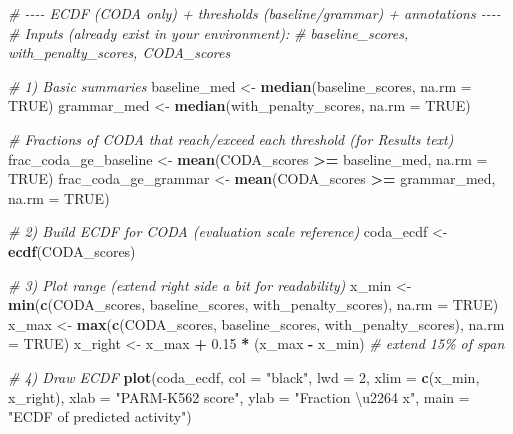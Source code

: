 \documentclass[
]{article}
\newenvironment{Shaded}{\begin{snugshade}}{\end{snugshade}}
\newcommand{\AttributeTok}[1]{\textcolor[rgb]{0.13,0.29,0.53}{#1}}
\newcommand{\CommentTok}[1]{\textcolor[rgb]{0.56,0.35,0.01}{\textit{#1}}}
\newcommand{\ConstantTok}[1]{\textcolor[rgb]{0.56,0.35,0.01}{#1}}
\newcommand{\DecValTok}[1]{\textcolor[rgb]{0.00,0.00,0.81}{#1}}
\newcommand{\FloatTok}[1]{\textcolor[rgb]{0.00,0.00,0.81}{#1}}
\newcommand{\FunctionTok}[1]{\textcolor[rgb]{0.13,0.29,0.53}{\textbf{#1}}}
\newcommand{\NormalTok}[1]{#1}
\newcommand{\OtherTok}[1]{\textcolor[rgb]{0.56,0.35,0.01}{#1}}
\newcommand{\SpecialCharTok}[1]{\textcolor[rgb]{0.81,0.36,0.00}{\textbf{#1}}}
\newcommand{\StringTok}[1]{\textcolor[rgb]{0.31,0.60,0.02}{#1}}
\begin{document}
\begin{Shaded}
\begin{Highlighting}[]
\CommentTok{\# {-}{-}{-}{-} ECDF (CODA only) + thresholds (baseline/grammar) + annotations {-}{-}{-}{-}}
\CommentTok{\# Inputs (already exist in your environment):}
\CommentTok{\#   baseline\_scores, with\_penalty\_scores, CODA\_scores}

\CommentTok{\# 1) Basic summaries}
\NormalTok{baseline\_med }\OtherTok{\textless{}{-}} \FunctionTok{median}\NormalTok{(baseline\_scores, }\AttributeTok{na.rm =} \ConstantTok{TRUE}\NormalTok{)}
\NormalTok{grammar\_med  }\OtherTok{\textless{}{-}} \FunctionTok{median}\NormalTok{(with\_penalty\_scores, }\AttributeTok{na.rm =} \ConstantTok{TRUE}\NormalTok{)}

\CommentTok{\# Fractions of CODA that reach/exceed each threshold (for Results text)}
\NormalTok{frac\_coda\_ge\_baseline }\OtherTok{\textless{}{-}} \FunctionTok{mean}\NormalTok{(CODA\_scores }\SpecialCharTok{\textgreater{}=}\NormalTok{ baseline\_med, }\AttributeTok{na.rm =} \ConstantTok{TRUE}\NormalTok{)}
\NormalTok{frac\_coda\_ge\_grammar  }\OtherTok{\textless{}{-}} \FunctionTok{mean}\NormalTok{(CODA\_scores }\SpecialCharTok{\textgreater{}=}\NormalTok{ grammar\_med,  }\AttributeTok{na.rm =} \ConstantTok{TRUE}\NormalTok{)}

\CommentTok{\# 2) Build ECDF for CODA (evaluation scale reference)}
\NormalTok{coda\_ecdf }\OtherTok{\textless{}{-}} \FunctionTok{ecdf}\NormalTok{(CODA\_scores)}

\CommentTok{\# 3) Plot range (extend right side a bit for readability)}
\NormalTok{x\_min }\OtherTok{\textless{}{-}} \FunctionTok{min}\NormalTok{(}\FunctionTok{c}\NormalTok{(CODA\_scores, baseline\_scores, with\_penalty\_scores), }\AttributeTok{na.rm =} \ConstantTok{TRUE}\NormalTok{)}
\NormalTok{x\_max }\OtherTok{\textless{}{-}} \FunctionTok{max}\NormalTok{(}\FunctionTok{c}\NormalTok{(CODA\_scores, baseline\_scores, with\_penalty\_scores), }\AttributeTok{na.rm =} \ConstantTok{TRUE}\NormalTok{)}
\NormalTok{x\_right }\OtherTok{\textless{}{-}}\NormalTok{ x\_max }\SpecialCharTok{+} \FloatTok{0.15} \SpecialCharTok{*}\NormalTok{ (x\_max }\SpecialCharTok{{-}}\NormalTok{ x\_min)  }\CommentTok{\# extend 15\% of span}

\CommentTok{\# 4) Draw ECDF}
\FunctionTok{plot}\NormalTok{(coda\_ecdf,}
     \AttributeTok{col  =} \StringTok{"black"}\NormalTok{,}
     \AttributeTok{lwd  =} \DecValTok{2}\NormalTok{,}
     \AttributeTok{xlim =} \FunctionTok{c}\NormalTok{(x\_min, x\_right),}
     \AttributeTok{xlab =} \StringTok{"PARM{-}K562 score"}\NormalTok{,}
     \AttributeTok{ylab =} \StringTok{"Fraction \textbackslash{}u2264 x"}\NormalTok{,}
     \AttributeTok{main =} \StringTok{"ECDF of predicted activity"}\NormalTok{)}
\end{Highlighting}
\end{Shaded}
\end{document}

